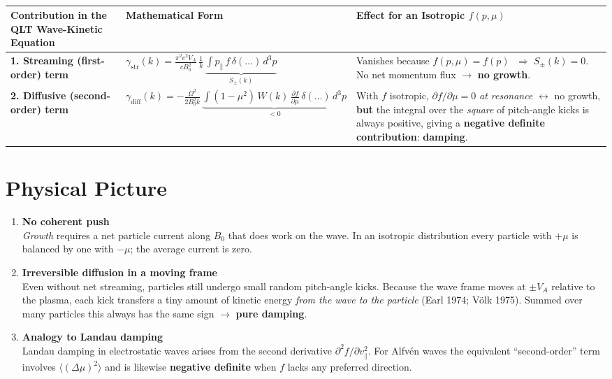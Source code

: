 \begin{table}[h!]
\centering
\begin{tabular}{|p{5cm}|p{5.5cm}|p{5.5cm}|}
\hline
\textbf{Contribution in the QLT Wave-Kinetic Equation} & \textbf{Mathematical Form} & \textbf{Effect for an \textbf{Isotropic} $f(p,\mu)$} \\
\hline
\textbf{1. Streaming (first-order) term} & 
$\displaystyle \gamma_{\text{str}}(k) = \frac{\pi^2 e^2 V_A}{c B_0^2}\, \frac{1}{k}\, \underbrace{\int p_\parallel\, f\, \delta(\dots)\, d^3p}_{S_\pm(k)}$ 
& 
Vanishes because $f(p,\mu) = f(p)$ $\;\Rightarrow\; S_\pm(k) = 0$. No net momentum flux $\rightarrow$ \textbf{no growth}. \\
\hline
\textbf{2. Diffusive (second-order) term} & 
$\displaystyle \gamma_{\text{diff}}(k) = -\frac{\Omega^2}{2 B_0^2 k}\, \underbrace{\int (1 - \mu^2)\, W(k)\, \frac{\partial f}{\partial \mu}\, \delta(\dots)\, d^3p}_{<0}$ 
& 
With $f$ isotropic, $\partial f / \partial \mu = 0$ \textit{at resonance} $\leftrightarrow$ no growth, \textbf{but} the integral over the \textit{square} of pitch-angle kicks is always positive, giving a \textbf{negative definite contribution}: \textbf{damping}. \\
\hline
\end{tabular}
\caption*{}
\end{table}

\section*{Physical Picture}

\begin{enumerate}
\item \textbf{No coherent push} \\
\textit{Growth} requires a net particle current along $B_0$ that does work on the wave.
In an isotropic distribution every particle with $+\mu$ is balanced by one with $-\mu$; the average current is zero.

\item \textbf{Irreversible diffusion in a moving frame} \\
Even without net streaming, particles still undergo small random pitch-angle kicks.
Because the wave frame moves at $\pm V_A$ relative to the plasma, each kick transfers a tiny amount of kinetic energy \textit{from the wave to the particle} (Earl 1974; Völk 1975). Summed over many particles this always has the same sign $\rightarrow$ \textbf{pure damping}.

\item \textbf{Analogy to Landau damping} \\
Landau damping in electrostatic waves arises from the second derivative $\partial^2 f / \partial v_\parallel^2$.
For Alfvén waves the equivalent ``second-order'' term involves $\langle (\Delta \mu)^2 \rangle$ and is likewise \textbf{negative definite} when $f$ lacks any preferred direction.
\end{enumerate}

